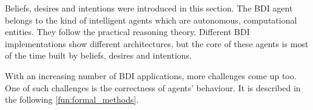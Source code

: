 Beliefs, desires and intentions were introduced in this section.
The BDI agent belongs to the kind of intelligent agents which are autonomous, computational entities.
They follow the practical reasoning theory.
Different BDI implementations show different architectures, but the core of these agents is most of the time built by beliefs, desires and intentions.

With an increasing number of BDI applications, more challenges come up too.
One of such challenges is the correctness of agents' behaviour.
It is described in the following \autoref{fun:formal_methods}.
